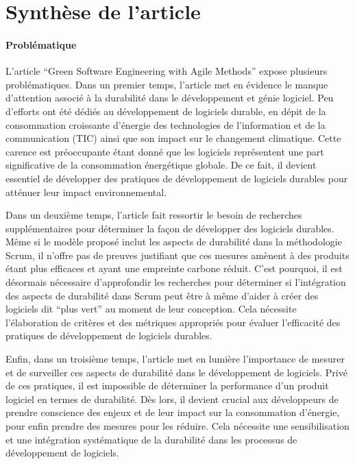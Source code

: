 \section{Synthèse de l'article}

\paragraph{Problématique}
L’article “Green Software Engineering with Agile Methods” expose plusieurs problématiques. Dans un premier temps, l'article met en évidence le manque d’attention associé à la durabilité dans le développement et génie logiciel. Peu d’efforts ont été dédiés au développement de logiciels durable, en dépit de la consommation croissante d’énergie des technologies de l’information et de la communication (TIC) ainsi que son impact sur le changement climatique. Cette carence est préoccupante étant donné que les logiciels représentent une part significative de la consommation énergétique globale. De ce fait, il devient essentiel de développer des pratiques de développement de logiciels durables pour atténuer leur impact environnemental.

Dans un deuxième temps, l’article fait ressortir le besoin de recherches supplémentaires pour déterminer la façon de développer des logiciels durables. Même si le modèle proposé inclut les aspects de durabilité dans la méthodologie Scrum, il n’offre pas de preuves justifiant que ces mesures amènent à des produits étant plus efficaces et ayant une empreinte carbone réduit. C’est pourquoi, il est désormais nécessaire d’approfondir les recherches pour déterminer si l’intégration des aspects de durabilité dans Scrum peut être à même d’aider à créer des logiciels dit “plus vert” au moment de leur conception. Cela nécessite l'élaboration de critères et des métriques appropriés pour évaluer l'efficacité des pratiques de développement de logiciels durables.

Enfin, dans un troisième temps, l’article met en lumière l’importance de mesurer et de surveiller ces aspects de durabilité dans le développement de logiciels. Privé de ces pratiques, il est impossible de déterminer la performance d’un produit logiciel en termes de durabilité. Dès lors, il devient crucial aux développeurs de prendre conscience des enjeux et de leur impact sur la consommation d’énergie, pour enfin prendre des mesures pour les réduire. Cela nécessite une sensibilisation et une intégration systématique de la durabilité dans les processus de développement de logiciels.

